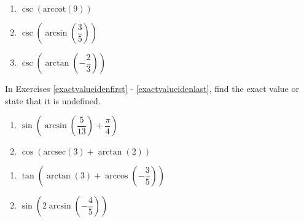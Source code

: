 \begin{multicols}{3}

\begin{enumerate}

\setcounter{enumi}{\value{HW}}

\item  $\csc\left(\text{arccot}\left(9 \right)\right)$ 
\item  $\csc\left(\arcsin\left(\dfrac{3}{5}\right)\right)$
\item  $\csc\left(\arctan\left(-\dfrac{2}{3}\right)\right)$ \label{stillmoreexactlast}

\setcounter{HW}{\value{enumi}}

\end{enumerate}

\end{multicols}

In Exercises \ref{exactvalueidenfirst} - \ref{exactvalueidenlast}, find the exact value or state that it is undefined.

\begin{multicols}{2}

\begin{enumerate}

\setcounter{enumi}{\value{HW}}

\item  $\sin\left(\arcsin\left( \dfrac{5}{13} \right) + \dfrac{\pi}{4}\right)$ \label{exactvalueidenfirst}
\item  $\cos\left( \text{arcsec}(3) + \arctan(2) \right)$ 

\setcounter{HW}{\value{enumi}}

\end{enumerate}

\end{multicols}

\begin{multicols}{2}

\begin{enumerate}

\setcounter{enumi}{\value{HW}}

\item  $\tan\left( \arctan(3) + \arccos\left(-\dfrac{3}{5}\right) \right)$
\item  $\sin\left(2\arcsin\left(-\dfrac{4}{5}\right)\right)$

\setcounter{HW}{\value{enumi}}

\end{enumerate}

\end{multicols}

